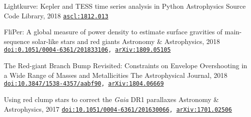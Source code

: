 \documentclass[]{k-cv} %
\begin{document}
{Lightkurve: Kepler and TESS time series analysis in Python}
{Astrophysics Source Code Library, 2018}
{\texttt{\href{http://ascl.net/1812.013}{ascl:1812.013}}}

{FliPer: A global measure of power density to estimate surface gravities of main-sequence solar-like stars and red giants}
{Astronomy \& Astrophysics, 2018}
{\texttt{\href{https://www.aanda.org/articles/aa/abs/2018/12/aa33106-18/aa33106-18.html}{doi:0.1051/0004-6361/201833106}, \href{https://arxiv.org/abs/1809.05105}{arXiv:1809.05105}}}

{The Red-giant Branch Bump Revisited: Constraints on Envelope Overshooting in a Wide Range of Masses and Metallicities}
{The Astrophysical Journal, 2018}
{\texttt{\href{https://iopscience.iop.org/article/10.3847/1538-4357/aabf90}{doi:10.3847/1538-4357/aabf90}, \href{https://arxiv.org/abs/1804.06669}{arXiv:1804.06669}}}

{Using red clump stars to correct the \emph{Gaia} DR1 parallaxes}
{Astronomy \& Astrophysics, 2017}
{\texttt{\href{https://www.aanda.org/articles/aa/abs/2017/02/aa30066-16/aa30066-16.html}{doi:10.1051/0004-6361/201630066}, \href{https://arxiv.org/abs/1701.02506}{arXiv:1701.02506}}}
\end{document}
